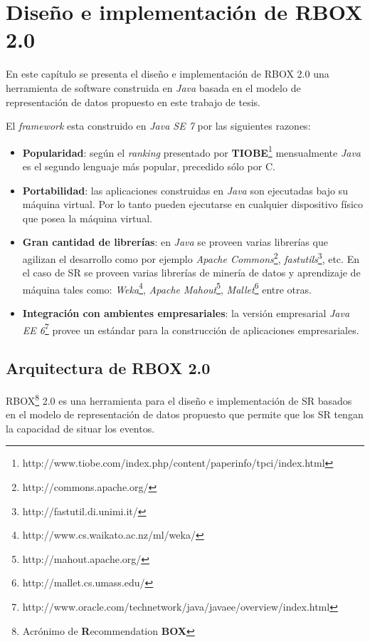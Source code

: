 \chapter{Diseño e implementaci\'on de RBOX 2.0}
\label{cap:diseno}

En este capítulo se presenta el diseño e implementación de RBOX 2.0 una herramienta de software construida en \textit{Java} basada en el modelo de representación de datos propuesto en este trabajo de tesis.

El \textit{framework} esta construido en \textit{Java SE 7} por las siguientes razones:

\begin{itemize}
	\item \textbf{Popularidad}: según el \textit{ranking} presentado por \textbf{TIOBE}\footnote{http://www.tiobe.com/index.php/content/paperinfo/tpci/index.html} mensualmente \textit{Java} es el segundo lenguaje más popular, precedido sólo por C.  
	\item \textbf{Portabilidad}: las aplicaciones construidas en \textit{Java} son ejecutadas bajo su máquina virtual. Por lo tanto pueden ejecutarse en cualquier dispositivo físico que posea la máquina virtual.
	\item \textbf{Gran cantidad de librerías}: en \textit{Java} se proveen varias librerías que agilizan el desarrollo como por ejemplo \textit{Apache Commons}\footnote{http://commons.apache.org/},   \textit{fastutils}\footnote{http://fastutil.di.unimi.it/}, etc. En el caso de SR se proveen varias librerías de minería de datos y aprendizaje de máquina tales como: \textit{Weka}\footnote{http://www.cs.waikato.ac.nz/ml/weka/}, \textit{Apache Mahout}\footnote{http://mahout.apache.org/}, \textit{Mallet}\footnote{http://mallet.cs.umass.edu/} entre otras.
	\item \textbf{Integración con ambientes empresariales}: la versión empresarial \textit{Java EE 6}\footnote{http://www.oracle.com/technetwork/java/javaee/overview/index.html} provee un estándar para la construcción de aplicaciones empresariales.
\end{itemize}


\section{Arquitectura de RBOX 2.0}


RBOX\footnote{Acrónimo de \textbf{R}ecommendation \textbf{BOX} } 2.0 es una herramienta para el diseño e implementación de SR basados en el modelo de representación de datos propuesto que permite que los SR tengan la capacidad de situar los eventos.

